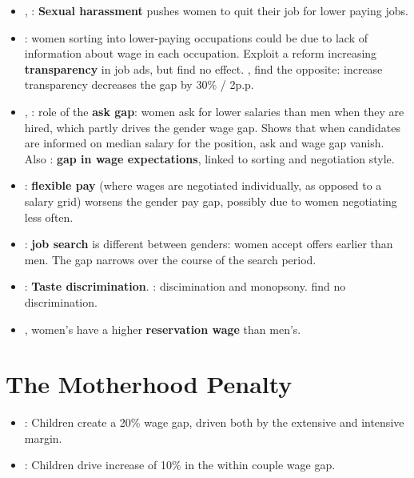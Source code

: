 \documentclass[12pt]{article}
\begin{document}
\begin{itemize}
    \item \cite{folkeSexualHarassmentGender2022}, \cite{batutItManWorld2022}: \textbf{Sexual harassment} pushes women to quit their job for lower paying jobs.
    \item \cite{bamiehCanWageTransparency2022}: women sorting into lower-paying occupations could be due to lack of information about wage in each occupation. Exploit a reform increasing \textbf{transparency} in job ads, but find no effect. \cite{bakerPayTransparencyGender2022}, \cite{bennedsenFirmsRespondGender2022} find the opposite: increase transparency decreases the gap by 30\% / 2p.p. 
    \item \cite{roussilleCentralRoleAsk2022}, \cite{dreberWhyWomenAsk2022}: role of the \textbf{ask gap}: women ask for lower salaries than men when they are hired, which partly drives the gender wage gap. Shows that when candidates are informed on median salary for the position, ask and wage gap vanish. Also \cite{kiesskingGenderDifferencesWage2019}: \textbf{gap in wage expectations}, linked to sorting and negotiation style.
    \item \cite{biasiFlexibleWagesBargaining2022}: \textbf{flexible pay} (where wages are negotiated individually, as opposed to a salary grid) worsens the gender pay gap, possibly due to women negotiating less often.
    \item \cite{cortesGenderDifferencesJob2021}: \textbf{job search} is different between genders: women accept offers earlier than men. The gap narrows over the course of the search period.
    \item \cite{sinWhatDrivesGender2022}: \textbf{Taste discrimination}. \cite{fanfaniTastesDiscriminationMonopsonistic2022}: discimination and monopsony. \cite{birkelundGenderDiscriminationHiring2022} find no discrimination.
    \item \cite{heyneGenderUnemploymentSubjective2022}, \cite{cukrowska-torzewskaGenderGapReservation2021} women's have a higher \textbf{reservation wage} than men's.
  \end{itemize}



  \section{The Motherhood Penalty}

  \begin{itemize}
    \item \cite{klevenChildrenGenderInequality2019}: Children create a 20\% wage gap, driven both by the extensive and intensive margin.
    \item \cite{angelovParenthoodGenderGap2016}: Children drive increase of 10\% in the within couple wage gap.
  \end{itemize}

  
\end{document}
